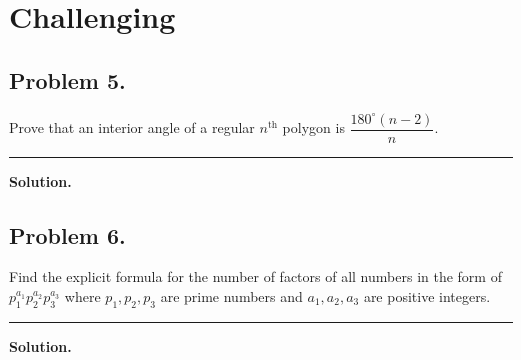 \documentclass{article}
\newcommand {\MyLine} {
    \smallskip \noindent\rule{\textwidth}{0.4pt} \smallskip
}
\begin{document}
\section*{\textcolor{BrickRed}{Challenging}}
\begin{minipage}[t][0.45\textheight][t]{\textwidth}
\subsection*{Problem 5.} %
{\color {Gray}
Prove that an interior angle of a regular $n^\text{th}$
polygon is $\dfrac{180^\circ (n - 2)}{n}$.
}

\MyLine

\textbf{Solution.}

\end{minipage}

\begin{minipage}[t][0.45\textheight][t]{\textwidth}
\subsection*{Problem 6.} %
{\color {Gray}
Find the explicit formula for the number of factors
of all numbers in the form of $p_1^{a_1} p_2^{a_2}
p_3^{a_3}$ where $p_1, p_2, p_3$ are prime numbers
and $a_1, a_2, a_3$ are positive integers.
}

\MyLine

\textbf{Solution.}

\end{minipage}
\end{document}
